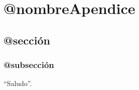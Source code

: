 \chapter{@nombreApendice}
\label{apendiceA}


\section{@sección}

\subsection{@subsección}

``Saludo''.


